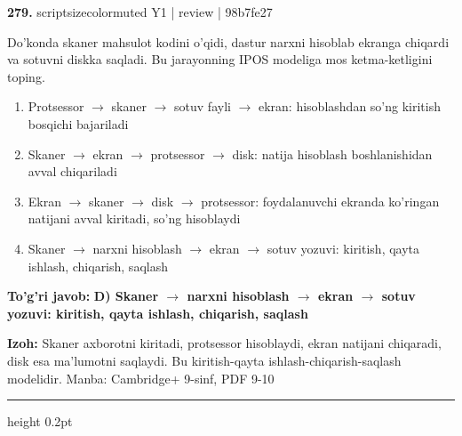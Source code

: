 \documentclass[10pt,a4paper]{article}
\begin{document}
{\bfseries\sffamily\color{ink} 279.} {scriptsizecolor{muted} Y1 | review | 98b7fe27}
\par
Do'konda skaner mahsulot kodini o'qidi, dastur narxni hisoblab ekranga chiqardi va sotuvni diskka saqladi. Bu jarayonning IPOS modeliga mos ketma-ketligini toping.
\begin{enumerate}[label=\Alph*),leftmargin=9mm]
\item Protsessor \ensuremath{\rightarrow} skaner \ensuremath{\rightarrow} sotuv fayli \ensuremath{\rightarrow} ekran: hisoblashdan so'ng kiritish bosqichi bajariladi
\item Skaner \ensuremath{\rightarrow} ekran \ensuremath{\rightarrow} protsessor \ensuremath{\rightarrow} disk: natija hisoblash boshlanishidan avval chiqariladi
\item Ekran \ensuremath{\rightarrow} skaner \ensuremath{\rightarrow} disk \ensuremath{\rightarrow} protsessor: foydalanuvchi ekranda ko'ringan natijani avval kiritadi, so'ng hisoblaydi
\item Skaner \ensuremath{\rightarrow} narxni hisoblash \ensuremath{\rightarrow} ekran \ensuremath{\rightarrow} sotuv yozuvi: kiritish, qayta ishlash, chiqarish, saqlash
\end{enumerate}
\begin{tcolorbox}[enhanced,breakable,colback=teal!4,colframe=teal!60!black,boxrule=0.45pt,arc=1.2mm,left=2.7mm,right=2.7mm,top=1.8mm,bottom=1.8mm,before skip=2mm,after skip=2mm]
{\bfseries\sffamily\color{teal}To'g'ri javob:} \textbf{D) Skaner \ensuremath{\rightarrow} narxni hisoblash \ensuremath{\rightarrow} ekran \ensuremath{\rightarrow} sotuv yozuvi: kiritish, qayta ishlash, chiqarish, saqlash}
\par\smallskip
{\bfseries Izoh:} Skaner axborotni kiritadi, protsessor hisoblaydi, ekran natijani chiqaradi, disk esa ma'lumotni saqlaydi. Bu kiritish-qayta ishlash-chiqarish-saqlash modelidir. Manba: Cambridge+ 9-sinf, PDF 9-10
\end{tcolorbox}
\vspace{2mm}\hrule height 0.2pt\vspace{3mm}
\end{document}
